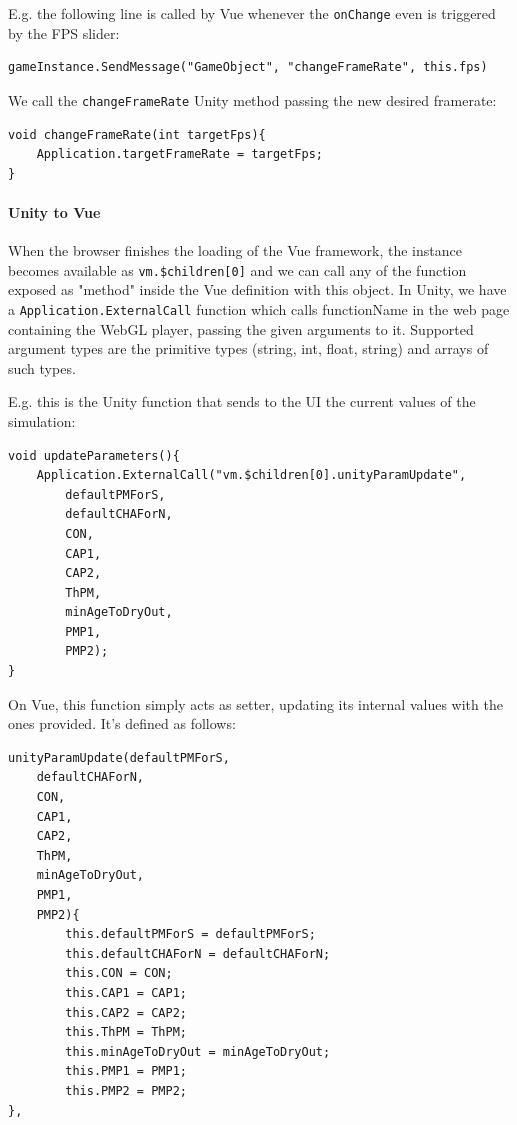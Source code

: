 E.g. the following line is called by Vue whenever the \texttt{onChange} even is triggered by the FPS slider:

\begin{verbatim}
gameInstance.SendMessage("GameObject", "changeFrameRate", this.fps)
\end{verbatim}

We call the \texttt{changeFrameRate} Unity method passing the new desired framerate:

\begin{verbatim}
void changeFrameRate(int targetFps){
    Application.targetFrameRate = targetFps;
}
\end{verbatim}

\paragraph{Unity to Vue}

When the browser finishes the loading of the Vue framework, the instance becomes available as \texttt{vm.\$children[0]} and we can call any of the function exposed as "method" inside the Vue definition with this object.
In Unity, we have a \texttt{Application.ExternalCall} function which calls functionName in the web page containing the WebGL player, passing the given arguments to it. Supported argument types are the primitive types (string, int, float, string) and arrays of such types.

E.g. this is the Unity function that sends to the UI the current values of the simulation:

\begin{verbatim}
void updateParameters(){
    Application.ExternalCall("vm.$children[0].unityParamUpdate",
        defaultPMForS,
        defaultCHAForN,
        CON,
        CAP1,
        CAP2,
        ThPM,
        minAgeToDryOut,
        PMP1,
        PMP2);
}
\end{verbatim}

On Vue, this function simply acts as setter, updating its internal values with the ones provided. It's defined as follows:

\begin{verbatim}
unityParamUpdate(defaultPMForS,
    defaultCHAForN,
    CON,
    CAP1,
    CAP2,
    ThPM,
    minAgeToDryOut,
    PMP1,
    PMP2){
        this.defaultPMForS = defaultPMForS;
        this.defaultCHAForN = defaultCHAForN;
        this.CON = CON;
        this.CAP1 = CAP1;
        this.CAP2 = CAP2;
        this.ThPM = ThPM;
        this.minAgeToDryOut = minAgeToDryOut;
        this.PMP1 = PMP1;
        this.PMP2 = PMP2;
},
\end{verbatim}



